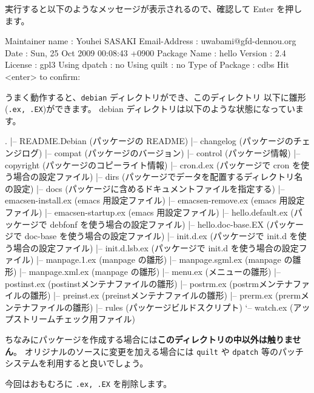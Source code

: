 \documentclass[mingoth,a4paper]{jsarticle}
\begin{document}
実行すると以下のようなメッセージが表示されるので、確認して Enter を押します。
\begin{commandline}
Maintainer name : Youhei SASAKI
Email-Address   : uwabami@gfd-dennou.org
Date            : Sun, 25 Oct 2009 00:08:43 +0900
Package Name    : hello
Version         : 2.4
License         : gpl3
Using dpatch    : no
Using quilt     : no
Type of Package : cdbs
Hit <enter> to confirm:
\end{commandline}
うまく動作すると、{\tt debian} ディレクトリができ、このディレクトリ
以下に雛形({\tt .ex, .EX})ができます。
debian ディレクトリは以下のような状態になっています。
\begin{commandline}
.
|-- README.Debian        (パッケージの README)
|-- changelog            (パッケージのチェンジログ)
|-- compat               (パッケージのバージョン)
|-- control              (パッケージ情報)
|-- copyright            (パッケージのコピーライト情報)
|-- cron.d.ex            (パッケージで cron を使う場合の設定ファイル)
|-- dirs                 (パッケージでデータを配置するディレクトリ名の設定)
|-- docs                 (パッケージに含めるドキュメントファイルを指定する)
|-- emacsen-install.ex   (emacs 用設定ファイル)
|-- emacsen-remove.ex    (emacs 用設定ファイル)
|-- emacsen-startup.ex   (emacs 用設定ファイル)
|-- hello.default.ex     (パッケージで debfonf を使う場合の設定ファイル)
|-- hello.doc-base.EX    (パッケージで doc-base を使う場合の設定ファイル)
|-- init.d.ex            (パッケージで init.d を使う場合の設定ファイル)
|-- init.d.lsb.ex        (パッケージで init.d を使う場合の設定ファイル)
|-- manpage.1.ex         (manpage の雛形)
|-- manpage.sgml.ex      (manpage の雛形)
|-- manpage.xml.ex       (manpage の雛形)
|-- menu.ex              (メニューの雛形)
|-- postinst.ex          (postinstメンテナファイルの雛形)
|-- postrm.ex            (postrmメンテナファイルの雛形)
|-- preinst.ex           (preinstメンテナファイルの雛形)
|-- prerm.ex             (prermメンテナファイルの雛形)
|-- rules                (パッケージビルドスクリプト)
`-- watch.ex             (アップストリームチェック用ファイル)
\end{commandline}

ちなみにパッケージを作成する場合には{\bf このディレクトリの中以外は触りません}。
オリジナルのソースに変更を加える場合には
{\tt quilt} や {\tt dpatch} 等のパッチシステムを利用すると良いでしょう。

今回はおもむろに {\tt .ex, .EX} を削除します。
\begin{commandline}
\end{commandline}
\end{document}
